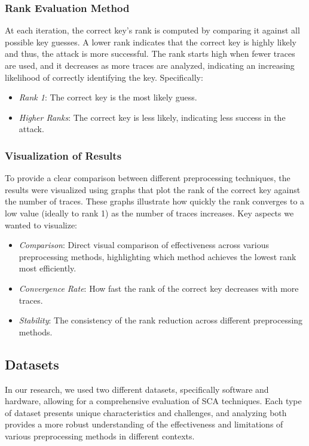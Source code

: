 \documentclass[a4paper,10pt]{article}
\begin{document}
\subsubsection{Rank Evaluation Method}
At each iteration, the correct key's rank is computed by comparing it against all possible key guesses. 
A lower rank indicates that the correct key is highly likely and thus, the attack is more successful. 
The rank starts high when fewer traces are used, and it decreases as more traces are analyzed, 
indicating an increasing likelihood of correctly identifying the key. Specifically:
\begin{itemize}
    \item \textit{Rank 1}: The correct key is the most likely guess.
    \item \textit{Higher Ranks}: The correct key is less likely, indicating less success in the attack.
\end{itemize}

\subsubsection{Visualization of Results}
To provide a clear comparison between different preprocessing techniques, the results were visualized using graphs that plot the rank of the correct key against the number of traces. 
These graphs illustrate how quickly the rank converges to a low value (ideally to rank 1) as the number of traces increases.
Key aspects we wanted to visualize:
\begin{itemize}
    \item \textit{Comparison}: Direct visual comparison of effectiveness across various preprocessing methods, highlighting which method achieves the lowest rank most efficiently.
    \item \textit{Convergence Rate}: How fast the rank of the correct key decreases with more traces.
    \item \textit{Stability}: The consistency of the rank reduction across different preprocessing methods.
\end{itemize}

\subsection{Datasets}
In our research, we used two different datasets, specifically software and hardware, allowing for a comprehensive evaluation of SCA techniques.
Each type of dataset presents unique characteristics and challenges, and analyzing both provides a more robust understanding of the effectiveness and limitations of various preprocessing methods in different contexts.
\end{document}
